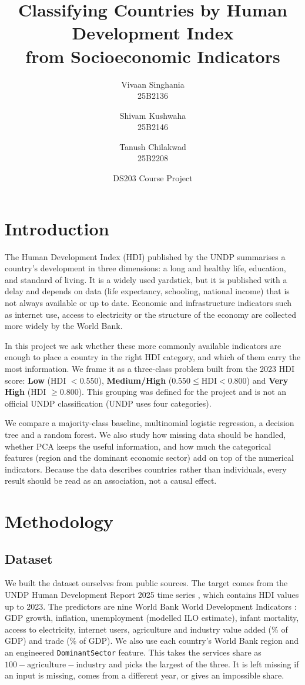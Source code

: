 \documentclass[10pt]{article}
\title{\vspace{-1.6cm}\textbf{Classifying Countries by Human Development Index\\from Socioeconomic Indicators}\vspace{-0.3cm}}
\author{Vivaan Singhania\\\small 25B2136 \and Shivam Kushwaha\\\small 25B2146 \and Tanush Chilakwad\\\small 25B2208}
\date{\vspace{-0.3cm}\small DS203 Course Project\vspace{-0.4cm}}
\begin{document}
\maketitle

\section{Introduction}

The Human Development Index (HDI) published by the UNDP summarises a country's development in three
dimensions: a long and healthy life, education, and standard of living. It is a widely used yardstick, but it
is published with a delay and depends on data (life expectancy, schooling, national income) that is not always
available or up to date. Economic and infrastructure indicators such as internet use, access to electricity or the
structure of the economy are collected more widely by the World Bank.

In this project we ask whether these more commonly available indicators are enough to place a country in the
right HDI category, and which of them carry the most information. We frame it as a three-class problem built
from the 2023 HDI score: \textbf{Low} (HDI $<0.550$), \textbf{Medium/High} ($0.550\le\text{HDI}<0.800$) and
\textbf{Very High} (HDI $\ge0.800$). This grouping was defined for the project and is not an official UNDP
classification (UNDP uses four categories).

We compare a majority-class baseline, multinomial logistic regression, a decision tree and a random forest. We
also study how missing data should be handled, whether PCA keeps the useful information, and how much the
categorical features (region and the dominant economic sector) add on top of the numerical indicators. Because
the data describes countries rather than individuals, every result should be read as an association, not a causal
effect.

\section{Methodology}

\subsection{Dataset}

We built the dataset ourselves from public sources. The target comes from the UNDP Human Development Report 2025
time series \cite{undp}, which contains HDI values up to 2023. The predictors are nine World Bank World Development
Indicators \cite{wdi}: GDP growth, inflation, unemployment (modelled ILO estimate), infant mortality, access to
electricity, internet users, agriculture and industry value added (\% of GDP) and trade (\% of GDP). We also use
each country's World Bank region and an engineered \texttt{DominantSector} feature. This takes the services share
as $100 - \text{agriculture} - \text{industry}$ and picks the largest of the three. It is left missing if an input
is missing, comes from a different year, or gives an impossible share.
\end{document}
